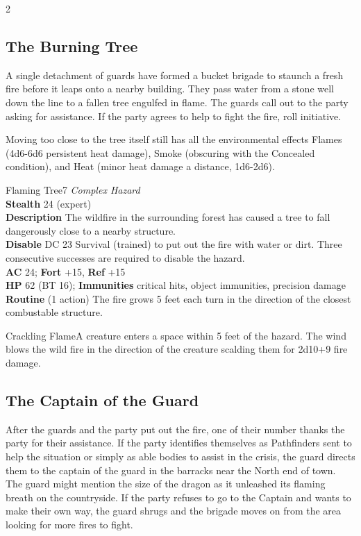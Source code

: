 \begin{multicols}{2}
\subsection{The Burning Tree}

A single detachment of guards have formed a bucket brigade to staunch a fresh fire before it leaps onto a nearby building. They pass water from a stone well down the line to a fallen tree engulfed in flame. The guards call out to the party asking for assistance. If the party agrees to help to fight the fire, roll initiative.

Moving too close to the tree itself still has all the environmental effects Flames (4d6-6d6 persistent heat damage), Smoke (obscuring with the Concealed condition), and Heat (minor heat damage a distance, 1d6-2d6).

  \begin{creaturebox}{Flaming Tree}{7}
    \textit{Complex Hazard}\\
    \textbf{Stealth} 24 (expert)\\
    \textbf{Description} The wildfire in the surrounding forest has caused a tree to fall dangerously close to a nearby structure.\\
    \textbf{Disable} DC 23 Survival (trained) to put out the fire with water or dirt. Three consecutive successes are required to disable the hazard.\\
    \textbf{AC} 24; \textbf{Fort} +15, \textbf{Ref} +15\\
    \textbf{HP} 62 (BT 16); \textbf{Immunities} critical hits, object immunities, precision damage\\
    \textbf{Routine} (1 action) The fire grows 5 feet each turn in the direction of the closest combustable structure.\\  
    \begin{pf-reaction}{Crackling Flame}{A creature enters a space within 5 feet of the hazard.}
      The wind blows the wild fire in the direction of the creature scalding them for 2d10+9 fire damage.
    \end{pf-reaction}
  \end{creaturebox}

  \subsection{The Captain of the Guard}

  After the guards and the party put out the fire, one of their number thanks the party for their assistance. If the party identifies themselves as Pathfinders sent to help the situation or simply as able bodies to assist in the crisis, the guard directs them to the captain of the guard in the barracks near the North end of town. The guard might mention the size of the dragon as it unleashed its flaming breath on the countryside. If the party refuses to go to the Captain and wants to make their own way, the guard shrugs and the brigade moves on from the area looking for more fires to fight. 


\end{multicols}
